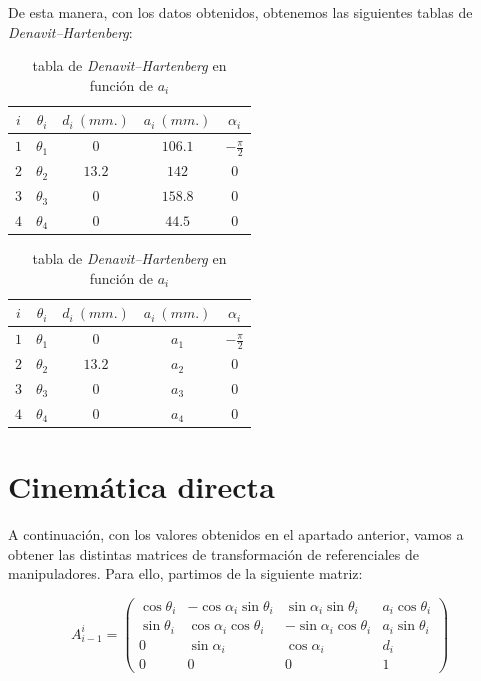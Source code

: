 \documentclass[a4paper,12pt]{article}
\begin{document}
De esta manera, con los datos obtenidos, obtenemos las siguientes tablas de \textit{Denavit–Hartenberg}:

\begin{table}[H]
    \parbox{.45\linewidth}{
        \centering
        \begin{tabular}{ c | c c c c }
            $i$ & $\theta_i$ & $d_i~(mm.)$ & $a_i~(mm.)$ & $\alpha_i$ \\ [0.5ex]
            \hline
            $1$ & $\theta_1$ & $0$ & $106.1$ & $-\frac{\pi}{2}$ \\
            $2$ & $\theta_2$ & $13.2$ & $142$ & $0$ \\
            $3$ & $\theta_3$ & $0$ & $158.8$ & $0$ \\
            $4$ & $\theta_4$ & $0$ & $44.5$ & $0$ \\ [1ex]
        \end{tabular}
        \caption{tabla de \textit{Denavit–Hartenberg}}
    }
    \hfill
    \parbox{.45\linewidth}{
        \centering
        \begin{tabular}{ c | c c c c }
            $i$ & $\theta_i$ & $d_i~(mm.)$ & $a_i~(mm.)$ & $\alpha_i$ \\ [0.5ex]
            \hline
            $1$ & $\theta_1$ & $0$ & $a_1$ & $-\frac{\pi}{2}$ \\
            $2$ & $\theta_2$ & $13.2$ & $a_2$ & $0$ \\
            $3$ & $\theta_3$ & $0$ & $a_3$ & $0$ \\
            $4$ & $\theta_4$ & $0$ & $a_4$ & $0$ \\ [1ex]
        \end{tabular}
        \caption{tabla de \textit{Denavit–Hartenberg} en función de $a_i$}
    }
\end{table}

\section{Cinemática directa}
A continuación, con los valores obtenidos en el apartado anterior, vamos a obtener las
distintas matrices de transformación de referenciales de manipuladores. Para ello, partimos de la
siguiente matriz:

\[
    A_{i-1}^i = 
    \begin{pmatrix}
        \cos\theta_i & -\cos\alpha_i\sin\theta_i & \sin\alpha_i\sin\theta_i & a_i\cos\theta_i \\
        \sin\theta_i & \cos\alpha_i\cos\theta_i & -\sin\alpha_i\cos\theta_i & a_i\sin\theta_i \\
        0 & \sin\alpha_i & \cos\alpha_i & d_i \\
        0 & 0 & 0 & 1
    \end{pmatrix}
\]
\end{document}
